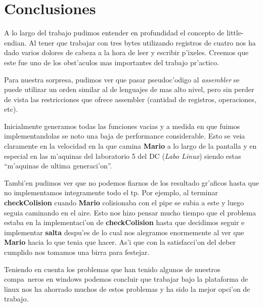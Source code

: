 \section{Conclusiones}
A lo largo del trabajo pudimos entender en profundidad el concepto de
little-endian. Al tener que trabajar con tres bytes utilizando registros de
cuatro nos ha dado varios dolores de cabeza a la hora de leer y escribir
p'ixeles. Creemos que este fue uno de los obst'aculos mas importantes del
trabajo pr'actico.

Para nuestra sorpresa, pudimos ver que pasar pseudoc'odigo al
\textit{assembler} se puede utilizar un orden similar al de lenguajes de mas
alto nivel, pero sin perder de vista las restricciones que ofrece assembler
(cantidad de registros, operaciones, etc).

Inicialmente generamos todas las funciones vacias y a medida en que fuimos
implementandolas se noto una baja de performance considerable. Esto se veia
claramente en la velocidad en la que camina \textbf{Mario} a lo largo de la pantalla y
en especial en las m'aquinas del laboratorio 5 del DC (\textit{Labo Linux})
siendo estas ``m'aquinas de ultima generaci'on''.

Tambi'en pudimos ver que no podemos fiarnos de los resultado gr'aficos hasta
que no implementamos integramente todo el tp. Por ejemplo, al terminar
\textbf{checkColision} cuando \textbf{Mario} colisionaba con el pipe se subia a este y luego
seguia caminando en el aire. Esto nos hizo pensar mucho tiempo que el
problema estaba en la implementaci'on de \textbf{checkColision} hasta que decidimos
seguir e implementar \textbf{salta} despu'es de lo cual nos alegramos
enormemente al ver que \textbf{Mario} hacia lo que tenia que hacer. As'i que con la
satisfacci'on del deber cumplido nos tomamos una birra para festejar.

Teniendo en cuenta los problemas que han tenido algunos de nuestros compa~neros
en windows podemos concluir que trabajar bajo la plataforma de linux nos ha
ahorrado muchos de estos problemas y ha sido la mejor opci'on de trabajo.

